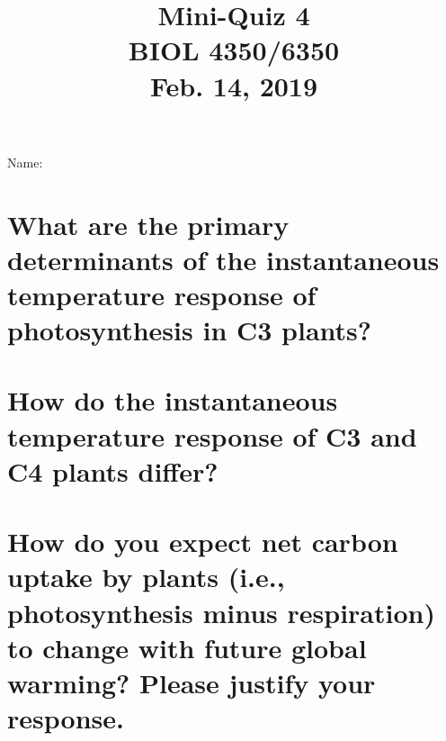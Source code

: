\documentclass[12pt, notitlepage]{article}   	%
\title{
	\textbf{
		Mini-Quiz 4
	} \\
	\large BIOL 4350/6350 \\
	\large Feb. 14, 2019 \\
}
\date{\vspace{-5ex}}
\def\wl{\par \vspace{\baselineskip}}
\begin{document}
{\selectfont %

\large{Name:}

{\let\newpage\relax\maketitle}

\section{\small{What are the primary determinants of the instantaneous temperature
response of photosynthesis in C3 plants?}}
\wl
\wl
\wl
\wl
\wl
\wl
\wl
\wl
\wl
\wl

\section{\small{How do the instantaneous temperature response of C3 and C4 plants 
differ?}}

\newpage

\section{\small{How do you expect net carbon uptake by plants (i.e., photosynthesis 
minus respiration) to change with future global warming?
Please justify your response.}}

} %
\end{document}
